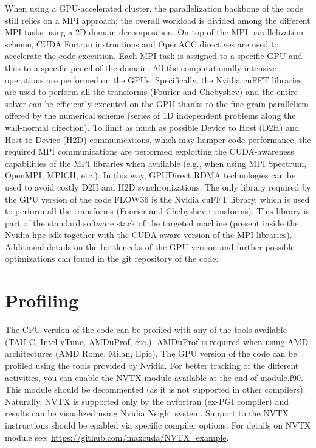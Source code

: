 When using a GPU-accelerated cluster, the parallelization backbone of the code still relies on a MPI approach; the overall workload is divided among the different MPI tasks using a 2D domain decomposition. 
On top of the MPI parallelization scheme, CUDA Fortran instructions and OpenACC directives are used to accelerate the code execution. 
Each MPI task is assigned to a specific GPU and thus to a specific pencil of the domain. 
All the computationally intensive operations are performed on the GPUs. 
Specifically, the Nvidia cuFFT libraries are used to perform all the transforms (Fourier and Chebyshev) and the entire solver can be efficiently executed on the GPU thanks to the fine-grain parallelism offered by the numerical scheme (series of 1D independent problems along the wall-normal direction). 
To limit as much as possible Device to Host (D2H) and Host to Device (H2D) communications, which may hamper code performance, the required MPI communications are performed exploiting the CUDA-awareness capabilities of the MPI libraries when available (e.g., when using MPI Spectrum, OpenMPI, MPICH, etc.). 
In this way, GPUDirect RDMA technologies can be used to avoid costly D2H and H2D synchronizations.
The only library required by the GPU version of the code FLOW36 is the Nvidia cuFFT library, which is used to perform all the transforms (Fourier and Chebyshev transforms). 
This library is part of the standard software stack of the targeted machine (present inside the Nvidia hpc-sdk together with the CUDA-aware version of the MPI libraries).
Additional details on the bottlenecks of the GPU version and further possible optimizations can found in the git repository of the code.

\section{Profiling}
\label{sec: profiling}

The CPU version of the code can be profiled with any of the tools available (TAU-C, Intel vTune, AMDuProf, etc.).
AMDuProf is required when using AMD architectures (AMD Rome, Milan, Epic).
The GPU version of the code can be profiled using the tools provided by Nvidia.
For better tracking of the different activities, you can enable the NVTX module available at the end of module.f90.
This module should be decommented (as it is not supported in other compilers).
Naturally, NVTX is supported only by the nvfortran (ex-PGI compiler) and results can be visualized using Nvidia Nsight system.
Support to the NVTX instructions should be enabled via specific compiler options.
For details on NVTX module see: \url{https://github.com/maxcuda/NVTX_example}.



